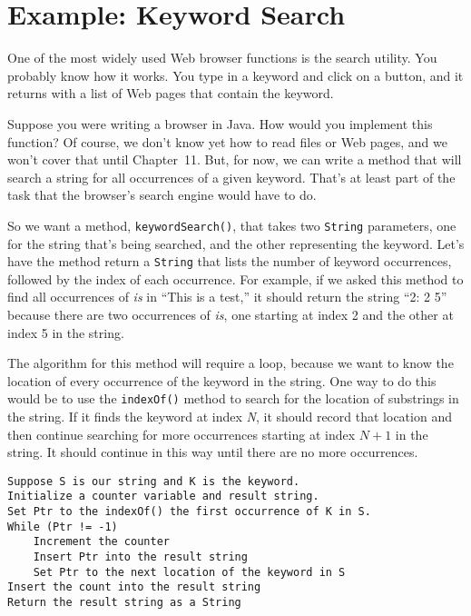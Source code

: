 \section{Example: Keyword Search}
\label{example-keyword-search}
\noindent One of the most widely used Web browser functions is the search
utility.   You probably know how it works.  You type in a keyword and
click on a button, and it returns with a list of Web pages that
contain the keyword.

Suppose you were writing a browser in Java.  How would you implement
this function? Of course, we don't know yet how to read files or Web
pages, and we won't cover that until Chapter~11.
But, for now, we can write a method that will search a string for all
occurrences of a given keyword.  That's at least part of the task that
the browser's search engine would have to do.

So we want a method, {\tt keywordSearch()}, that takes two
{\tt String} parameters, one for the string that's being searched, and the
other representing the keyword.  Let's have the method return a
{\tt String} that lists the number of keyword occurrences, followed
by the index of each occurrence.  For example, if we asked this method
to find all occurrences of {\it is} in ``This is a test,'' it should return
the string ``2: 2 5'' because there are two occurrences of
{\it is}, one starting at index 2 and the other at index 5 in the string.

The algorithm for this method will require a loop, because we want to
know the location of every occurrence of the keyword in the string.
One way to do this would be to use the {\tt indexOf()} method to
search for the location of substrings in the string.   If it finds the
keyword at index {\it N}, it should record that location and then continue
searching for more occurrences starting at index $N+1$ in the string.  It
should continue in this way until there are no more occurrences.

\begin{jjjlisting}
\begin{lstlisting}
Suppose S is our string and K is the keyword.
Initialize a counter variable and result string.
Set Ptr to the indexOf() the first occurrence of K in S.
While (Ptr != -1)
    Increment the counter
    Insert Ptr into the result string
    Set Ptr to the next location of the keyword in S
Insert the count into the result string
Return the result string as a String
\end{lstlisting}
\end{jjjlisting}

